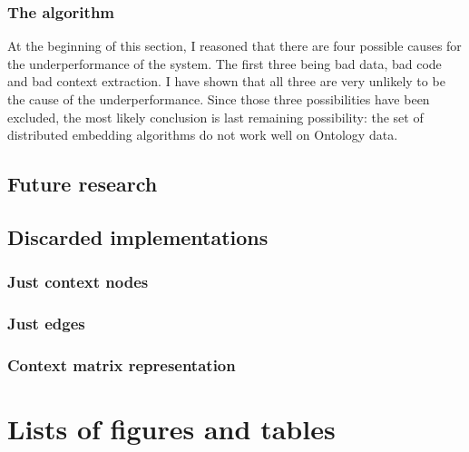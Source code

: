 \documentclass{article}
\begin{document}
  \subsubsection{The algorithm}
  At the beginning of this section, I reasoned that there are four possible causes for the underperformance of the system. The first three being bad data, bad code and bad context extraction. I have shown that all three are very unlikely to be the cause of the underperformance. Since those three possibilities have been excluded, the most likely conclusion is last remaining possibility: the set of distributed embedding algorithms do not work well on Ontology data.
  
  
 \subsection{Future research}
 
 
 \subsection{Discarded implementations}

  \subsubsection{Just context nodes}
  
  \subsubsection{Just edges}
  
  \subsubsection{Context matrix representation}
 
 \section{Lists of figures and tables}
 
\end{document}
